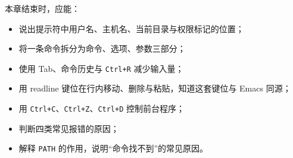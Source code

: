 \begin{checkpoint}
本章结束时，应能：
\begin{itemize}
  \item 说出提示符中用户名、主机名、当前目录与权限标记的位置；
  \item 将一条命令拆分为命令、选项、参数三部分；
  \item 使用 Tab、命令历史与 \texttt{Ctrl+R} 减少输入量；
  \item 用 readline 键位在行内移动、删除与粘贴，知道这套键位与 Emacs 同源；
  \item 用 \texttt{Ctrl+C}、\texttt{Ctrl+Z}、\texttt{Ctrl+D} 控制前台程序；
  \item 判断四类常见报错的原因；
  \item 解释 \texttt{PATH} 的作用，说明“命令找不到”的常见原因。
\end{itemize}
\end{checkpoint}
